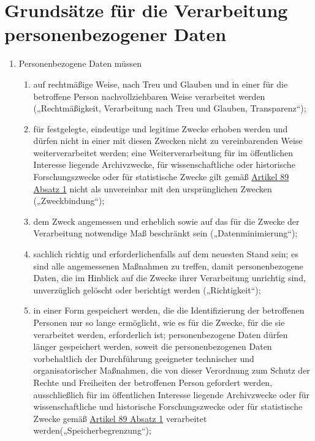 \chapter{Grundsätze für die Verarbeitung personenbezogener Daten}
\label{ch:5}


\begin{enumerate}

  \item Personenbezogene Daten müssen
  \label{itm:05-1}

  \begin{enumerate}
  
    \item auf rechtmäßige Weise, nach Treu und Glauben und in einer für die betroffene Person nachvollziehbaren Weise
     verarbeitet werden („Rechtmäßigkeit, Verarbeitung nach Treu und Glauben, Transparenz“);
    \label{itm:05-1a}

    \item für festgelegte, eindeutige und legitime Zwecke erhoben werden und dürfen nicht in einer mit diesen Zwecken
     nicht zu vereinbarenden Weise weiterverarbeitet werden; eine Weiterverarbeitung für im öffentlichen Interesse
     liegende Archivzwecke, für wissenschaftliche oder historische Forschungszwecke oder für statistische Zwecke gilt
     gemäß \hyperref[itm:89-1]{Artikel 89 Absatz 1} nicht als unvereinbar mit den ursprünglichen
     Zwecken („Zweckbindung“);
    \label{itm:05-1b}

    \item dem Zweck angemessen und erheblich sowie auf das für die Zwecke der Verarbeitung notwendige Maß beschränkt
     sein („Datenminimierung“);
    \label{itm:05-1c}

    \item sachlich richtig und erforderlichenfalls auf dem neuesten Stand sein; es sind alle angemessenen Maßnahmen zu
     treffen, damit personenbezogene Daten, die im Hinblick auf die Zwecke ihrer Verarbeitung unrichtig sind,
     unverzüglich gelöscht oder berichtigt werden („Richtigkeit“);
    \label{itm:05-1d}

    \item in einer Form gespeichert werden, die die Identifizierung der betroffenen Personen nur so lange ermöglicht,
     wie es für die Zwecke, für die sie verarbeitet werden, erforderlich ist; personenbezogene Daten dürfen länger
     gespeichert werden, soweit die personenbezogenen Daten vorbehaltlich der Durchführung geeigneter technischer und
     organisatorischer Maßnahmen, die von dieser Verordnung zum Schutz der Rechte und Freiheiten der betroffenen Person
     gefordert werden, ausschließlich für im öffentlichen Interesse liegende Archivzwecke oder für wissenschaftliche
     und historische Forschungszwecke oder für statistische Zwecke gemäß \hyperref[itm:89-1]{Artikel 89 Absatz 1}
     verarbeitet werden(„Speicherbegrenzung“);
    \label{itm:05-1e}


\end{enumerate}
\end{enumerate}
